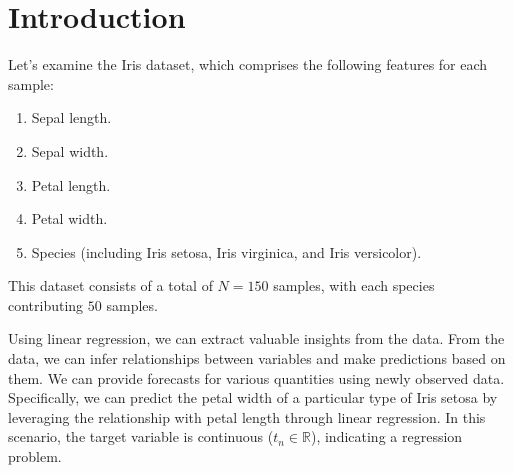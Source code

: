 \section{Introduction}

Let's examine the Iris dataset, which comprises the following features for each sample:
\begin{enumerate}
    \item Sepal length.
    \item Sepal width.
    \item Petal length.
    \item Petal width.
    \item Species (including Iris setosa, Iris virginica, and Iris versicolor).
\end{enumerate}
This dataset consists of a total of $N = 150$ samples, with each species contributing $50$ samples.

Using linear regression, we can extract valuable insights from the data.
From the data, we can infer relationships between variables and make predictions based on them.
We can provide forecasts for various quantities using newly observed data.
Specifically, we can predict the petal width of a particular type of Iris setosa by leveraging the relationship with petal length through linear regression.
In this scenario, the target variable is continuous ($t_n \in \mathbb{R}$), indicating a regression problem.